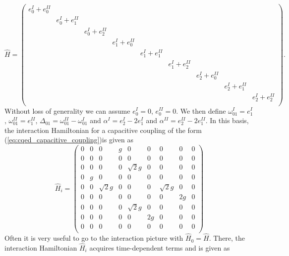 \begin{equation}
\hat{H} = \left( \begin{array}{ccccccccc}
										e_0^I+e_0^{II} \\
										& e_{0}^I+e_1^{II} \\
										& & e_{0}^I+e_2^{II} \\
										& & & e_{1}^I+e_0^{II} \\
										& & & & e_{1}^I+e_1^{II} \\
										& & & & & e_{1}^I+e_2^{II} \\
										& & & & & & e_{2}^{I}+e_0^{II} \\
										& & & & & & & e_{2}^{I}+e_1^{II} \\
										& & & & & & & & e_{2}^{I}+e_2^{II} \\
									\end{array}
					\right).
\end{equation}
%
Without loss of generality we can assume $e_0^{I}=0$, $e_0^{II}=0$. We then define $\omega_{01}^I=e_1^{I}$, $\omega_{01}^{II}=e_1^{II}$, $\Delta_{01} = \omega_{01}^{II}-\omega_{01}^I$ and $\alpha^I = e_2^I-2e_1^{I}$ and $\alpha^{II} = e_2^{II}-2e_1^{II}$. In this basis, the interaction Hamiltonian for a capacitive coupling of the form (\ref{eq:cqed_capacitive_coupling})is given as
%
\begin{equation}
\hat{H}_i = \left(
			\begin{array}{ccccccccc}
				0 & 0 & 0 & g & 0 & 0 & 0 & 0 & 0 \\
				0 & 0 & 0 & 0 & 0 & 0 & 0 & 0 & 0 \\
				0 & 0 & 0 & 0 & \sqrt{2}g & 0 & 0 & 0 & 0 \\
				0 & g & 0 & 0 & 0 & 0 & 0 & 0 & 0 \\
				0 & 0 & \sqrt{2}g & 0 & 0 & 0 & \sqrt{2}g & 0 & 0 \\
				0 & 0 & 0 & 0 & 0 & 0 & 0 & 2g & 0 \\
				0 & 0 & 0 & 0 & \sqrt{2}g & 0 & 0 & 0 & 0 \\
				0 & 0 & 0 & 0 & 0 & 2g & 0 & 0 & 0 \\
				0 & 0 & 0 & 0 & 0 & 0 & 0 & 0 & 0 \\
			\end{array}
		\right)
\end{equation}
%
Often it is very useful to go to the interaction picture with $\hat{H}_0 = \hat{H}$. There, the interaction Hamiltonian $\hat{H}_i$ acquires time-dependent terms and is given as
%
